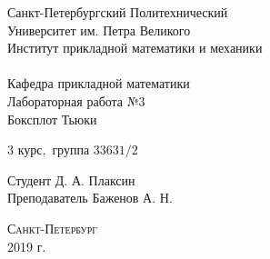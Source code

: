 \documentclass[a4]{article}
\begin{document}
\def\contentsname{\LARGE{Содержание}}
\thispagestyle{empty}
\begin{center} 
\vspace{2cm} 
{\Large \sc Санкт-Петербургский Политехнический}\\
\vspace{2mm}
{\Large \sc Университет} им. {\Large\sc Петра Великого}\\
\vspace{1cm}
{\large \sc Институт прикладной математики и механики\\ 
\vspace{0.5mm}
\textsc{}}\\ 
\vspace{0.5mm}
{\large\sc Кафедра прикладной математики}\\
\vspace{15mm}
{\huge \sc Лабораторная работа №$3$\\
\vspace{4mm}
Боксплот Тьюки
\vspace{6mm}
 }
\vspace*{2mm}
\vspace{1cm}

{\sc $3$ курс$,$ группа $33631/2$}

\vspace{2cm} 
Студент \hfill Д. А. Плаксин\\
\vspace{1cm}
Преподаватель \hfill Баженов А. Н.\\
\vspace{20mm} 

\end{center} 
\begin{center}
\vfill {\large\textsc{Санкт-Петербург}}\\ 
2019 г.
\end{center}


\newpage
\pagestyle{plain}
\end{document}

